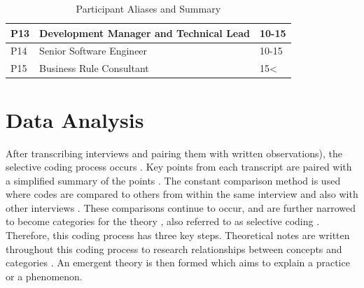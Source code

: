 \begin{table}[!hb]
\begin{tabular}{|l|l|l|}
\multicolumn{1}{|l|}{P13}          & \multicolumn{1}{l|}{Development Manager and Technical Lead} & \multicolumn{1}{l|}{10-15}                      \\ \hline
\multicolumn{1}{|l|}{P14}          & \multicolumn{1}{l|}{Senior Software Engineer}               & \multicolumn{1}{l|}{10-15}                      \\ \hline
P15                                & Business Rule Consultant                                    & 15\textless{}                                   \\ \hline
\end{tabular}
\centering
\caption{Participant Aliases and Summary}
\centering
\end{table}

\section{Data Analysis} 

After transcribing interviews and pairing them with written observations), the selective coding process occurs \cite{geeks}. Key points from each transcript are paired with a simplified summary of the points \cite{geeks}. The constant comparison method is used where codes are compared to others from within the same interview and also with other interviews \cite{geeks}. These comparisons continue to occur, and are further narrowed to become categories for the theory \cite{geeks}, also referred to as selective coding \cite{geeks}. Therefore, this coding process has three key steps. Theoretical notes are written throughout this coding process to research relationships between concepts and categories \cite{geeks}. An emergent theory is then formed which aims to explain a practice or a phenomenon. 








